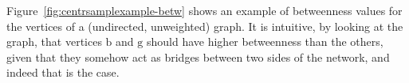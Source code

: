 \ifproof
Figure~\ref{fig:centrsamplexample-betw} shows an example of betweenness values for the
vertices of a (undirected, unweighted) graph. It is intuitive, by looking at the
graph, that vertices $\mathrm{b}$ and $\mathrm{g}$ should have higher
betweenness than the others, given that they somehow act as bridges between two
sides of the network, and indeed that is the case.
\begin{figure}[ht]
  \centering
 \hfill
\end{figure}
